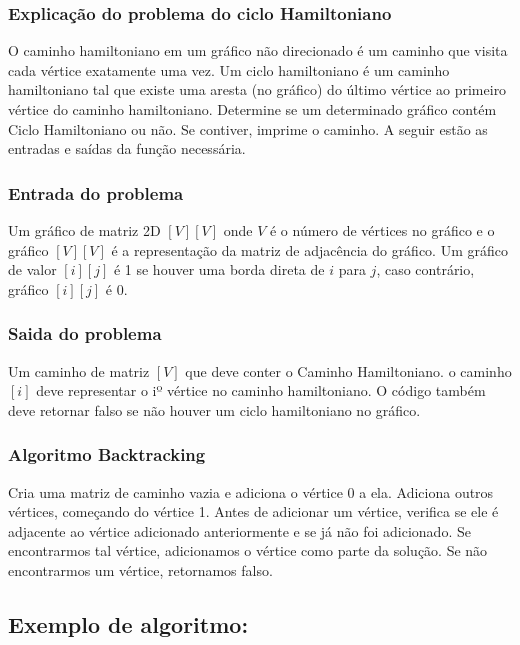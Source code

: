 \subsubsection*{Explicação do problema do ciclo Hamiltoniano}

O caminho hamiltoniano em um gráfico não direcionado é um caminho que visita cada vértice exatamente uma vez. 
Um ciclo hamiltoniano é um caminho hamiltoniano tal que existe uma aresta (no gráfico) do último vértice ao primeiro vértice do caminho hamiltoniano. 
Determine se um determinado gráfico contém Ciclo Hamiltoniano ou não. Se contiver, imprime o caminho. A seguir estão as entradas e saídas da função necessária.

\subsubsection*{Entrada do problema}

Um gráfico de matriz 2D $[V] [V]$ onde $V$ é o número de vértices no gráfico e o gráfico $[V] [V]$ é a representação da matriz de adjacência do gráfico. 
Um gráfico de valor $[i] [j]$ é 1 se houver uma borda direta de $i$ para $j$, caso contrário, gráfico $[i] [j]$ é 0.

\subsubsection*{Saida do problema}

Um caminho de matriz $[V]$ que deve conter o Caminho Hamiltoniano. o caminho $[i]$ deve representar o iº vértice no caminho hamiltoniano. 
O código também deve retornar falso se não houver um ciclo hamiltoniano no gráfico.

\subsubsection*{Algoritmo Backtracking}  

Cria uma matriz de caminho vazia e adiciona o vértice 0 a ela. 
Adiciona outros vértices, começando do vértice 1. 
Antes de adicionar um vértice, verifica se ele é adjacente ao vértice adicionado anteriormente e se já não foi adicionado. 
Se encontrarmos tal vértice, adicionamos o vértice como parte da solução. 
Se não encontrarmos um vértice, retornamos falso.

\subsection{Exemplo de algoritmo:}

